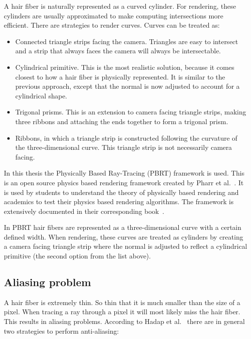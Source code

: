 \documentclass[11pt,a4paper]{report}
\begin{document}
A hair fiber is naturally represented as a curved cylinder. For rendering, these cylinders are usually approximated to make computing intersections more efficient. There are strategies to render curves. Curves can be treated as:

\begin{itemize}
\item Connected triangle strips facing the camera. Triangles are easy to intersect and a strip that always faces the camera will always be intersectable.

\item Cylindrical primitive. This is the most realistic solution, because it comes closest to how a hair fiber is physically represented. It is similar to the previous approach, except that the normal is now adjusted to account for a cylindrical shape.

\item Trigonal prisms. This is an extension to camera facing triangle strips, making three ribbons and attaching the ends together to form a trigonal prism.

\item Ribbons, in which a triangle strip is constructed following the curvature of the three-dimensional curve. This triangle strip is not necessarily camera facing.

\end{itemize}

In this thesis the Physically Based Ray-Tracing (PBRT) framework is used. This is an open source physics based rendering framework created by Pharr et al.~\cite{pharr2017}. It is used by students to understand the theory of physically based rendering and academics to test their physics based rendering algorithms. The framework is extensively documented in their corresponding book~\cite{pharr2017}.

In PBRT hair fibers are represented as a three-dimensional curve with a certain defined width. When rendering, these curves are treated as cylinders by creating a camera facing triangle strip where the normal is adjusted to reflect a cylindrical primitive (the second option from the list above).

\subsection{Aliasing problem}

A hair fiber is extremely thin. So thin that it is much smaller than the size of a pixel. When tracing a ray through a pixel it will most likely miss the hair fiber. This results in aliasing problems. According to Hadap et al.~\cite{hadap} there are in general two strategies to perform anti-aliasing:
\end{document}
